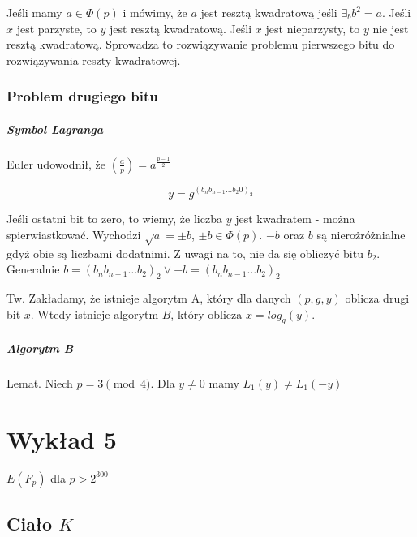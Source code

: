 \documentclass{report}
\begin{document}
Jeśli mamy $a \in \Phi(p)$ i mówimy, że $a$ jest resztą kwadratową jeśli $\exists_b b^2 = a$. Jeśli $x$ jest parzyste, to $y$ jest resztą kwadratową. Jeśli $x$ jest nieparzysty, to $y$ nie jest resztą kwadratową. Sprowadza to rozwiązywanie problemu pierwszego bitu do rozwiązywania reszty kwadratowej.

\subsection{Problem drugiego bitu}

\paragraph{Symbol Lagranga}

Euler udowodnił, że $\left( \frac{a}{p} \right) = a^{\frac{p-1}{2}}$

$$ y = g^{(b_nb_{n-1}\dots b_2 0)_2} $$

Jeśli ostatni bit to zero, to wiemy, że liczba $y$ jest kwadratem - można spierwiastkować. Wychodzi $\sqrt{a} = \pm b$, $\pm b \in \Phi(p)$. $-b$ oraz $b$ są nierożróżnialne gdyż obie są liczbami dodatnimi. Z uwagi na to, nie da się obliczyć bitu $b_2$. Generalnie $b = (b_nb_{n-1}\dots b_2)_2 \lor -b = (b_nb_{n-1}\dots b_2)_2$

Tw. Zakładamy, że istnieje algorytm A, który dla danych $(p, g, y)$ oblicza drugi bit $x$. Wtedy istnieje algorytm $B$, który oblicza $x = log_g(y)$.

\paragraph{Algorytm B}


Lemat. Niech $p = 3 \pmod{4}$. Dla $y \neq 0$ mamy $L_1(y) \neq L_1(-y)$

\chapter{Wykład 5}

$ E(F_p) $ dla $ p > 2^300 $

\section{Ciało $K$}
\end{document}
